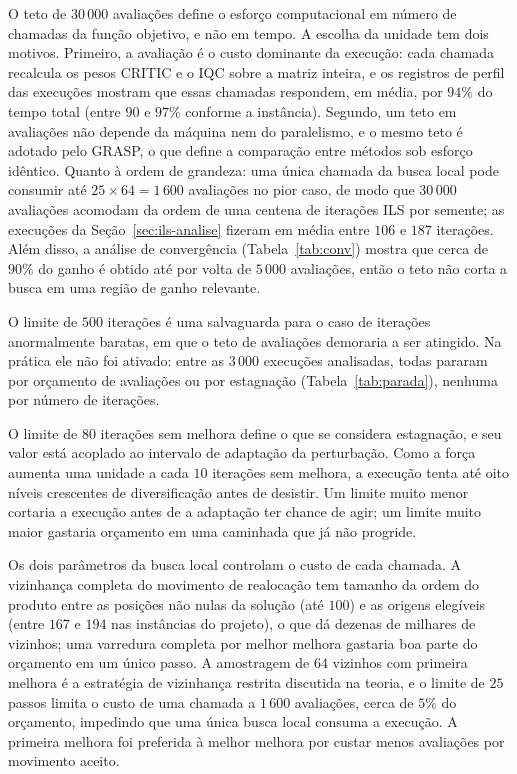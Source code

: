 \documentclass[11pt,a4paper]{article}
\begin{document}
O teto de $30\,000$ avaliações define o esforço computacional em número de chamadas da função objetivo, e não em tempo. A escolha da unidade tem dois motivos. Primeiro, a avaliação é o custo dominante da execução: cada chamada recalcula os pesos CRITIC e o IQC sobre a matriz inteira, e os registros de perfil das execuções mostram que essas chamadas respondem, em média, por $94\%$ do tempo total (entre $90$ e $97\%$ conforme a instância). Segundo, um teto em avaliações não depende da máquina nem do paralelismo, e o mesmo teto é adotado pelo GRASP, o que define a comparação entre métodos sob esforço idêntico. Quanto à ordem de grandeza: uma única chamada da busca local pode consumir até $25 \times 64 = 1\,600$ avaliações no pior caso, de modo que $30\,000$ avaliações acomodam da ordem de uma centena de iterações ILS por semente; as execuções da Seção~\ref{sec:ils-analise} fizeram em média entre $106$ e $187$ iterações. Além disso, a análise de convergência (Tabela~\ref{tab:conv}) mostra que cerca de $90\%$ do ganho é obtido até por volta de $5\,000$ avaliações, então o teto não corta a busca em uma região de ganho relevante.

O limite de $500$ iterações é uma salvaguarda para o caso de iterações anormalmente baratas, em que o teto de avaliações demoraria a ser atingido. Na prática ele não foi ativado: entre as $3\,000$ execuções analisadas, todas pararam por orçamento de avaliações ou por estagnação (Tabela~\ref{tab:parada}), nenhuma por número de iterações.

O limite de $80$ iterações sem melhora define o que se considera estagnação, e seu valor está acoplado ao intervalo de adaptação da perturbação. Como a força aumenta uma unidade a cada $10$ iterações sem melhora, a execução tenta até oito níveis crescentes de diversificação antes de desistir. Um limite muito menor cortaria a execução antes de a adaptação ter chance de agir; um limite muito maior gastaria orçamento em uma caminhada que já não progride.

Os dois parâmetros da busca local controlam o custo de cada chamada. A vizinhança completa do movimento de realocação tem tamanho da ordem do produto entre as posições não nulas da solução (até $100$) e as origens elegíveis (entre $167$ e $194$ nas instâncias do projeto), o que dá dezenas de milhares de vizinhos; uma varredura completa por melhor melhora gastaria boa parte do orçamento em um único passo. A amostragem de $64$ vizinhos com primeira melhora é a estratégia de vizinhança restrita discutida na teoria, e o limite de $25$ passos limita o custo de uma chamada a $1\,600$ avaliações, cerca de $5\%$ do orçamento, impedindo que uma única busca local consuma a execução. A primeira melhora foi preferida à melhor melhora por custar menos avaliações por movimento aceito.
\end{document}
